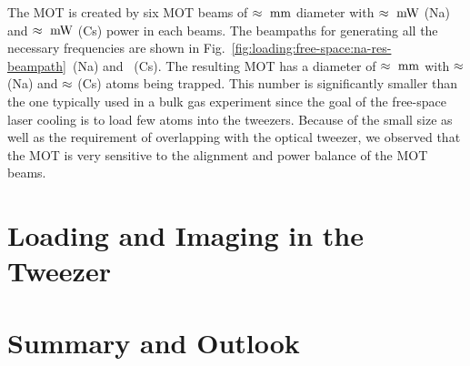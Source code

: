 The MOT is created by six MOT beams of $\approx\todo{number}~\mathrm{mm}$ diameter
with $\approx\todo{number}~\mathrm{mW}$ (Na) and $\approx\todo{number}~\mathrm{mW}$ (Cs)
power in each beams.
The beampaths for generating all the necessary frequencies are shown in
Fig.~\ref{fig:loading:free-space:na-res-beampath}~(Na) and \todo{}~(Cs).
The resulting MOT has a diameter of $\approx\todo{number}~\mathrm{mm}$
with $\approx\todo{number}$ (Na) and $\approx\todo{number}$ (Cs) atoms being trapped.
This number is significantly smaller than the one typically used in a bulk gas experiment
since the goal of the free-space laser cooling is to load few atoms into the tweezers.
Because of the small size as well as the requirement of overlapping with the optical tweezer,
we observed that the MOT is very sensitive to the alignment and power balance of the MOT beams.


\section{Loading and Imaging in the Tweezer}
\label{ch:loading:loading}



\section{Summary and Outlook}
\label{ch:loading:summary}

\todo{}

